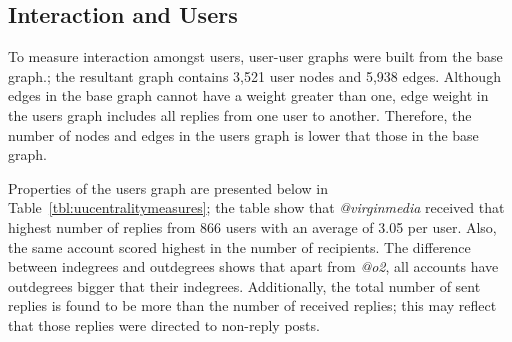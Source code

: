 \documentclass[sigconf]{acmart}
\begin{document}
{\subsection{Interaction and Users}


To measure interaction amongst users, user-user graphs were built 
from the base graph.; the resultant graph contains 3,521 user nodes 
and 5,938 edges. %
Although edges in the base graph cannot
have a weight greater than one, edge weight in the users graph includes all 
replies from one user to another. Therefore, the number of nodes and edges
in the users graph is lower that those in the base graph.


Properties of the users graph are presented below in
Table~\ref{tbl:uucentralitymeasures}; the table show that
{\emph{@virginmedia}} received that highest number of replies from 866
users with an average of 3.05 per user. Also, the same account scored
highest in the number of recipients. The difference between indegrees
and outdegrees shows that apart from {\emph{@o2}}, all accounts have
outdegrees bigger that their indegrees. Additionally, the total number
of sent replies is found to be more than the number of received
replies; this may reflect that those replies were directed to
non-reply posts.

}
\end{document}
